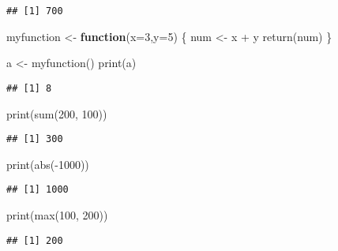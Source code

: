 \documentclass[
]{article}
\newenvironment{Shaded}{\begin{snugshade}}{\end{snugshade}}
\newcommand{\AttributeTok}[1]{\textcolor[rgb]{0.77,0.63,0.00}{#1}}
\newcommand{\ControlFlowTok}[1]{\textcolor[rgb]{0.13,0.29,0.53}{\textbf{#1}}}
\newcommand{\DecValTok}[1]{\textcolor[rgb]{0.00,0.00,0.81}{#1}}
\newcommand{\FunctionTok}[1]{\textcolor[rgb]{0.00,0.00,0.00}{#1}}
\newcommand{\NormalTok}[1]{#1}
\newcommand{\OtherTok}[1]{\textcolor[rgb]{0.56,0.35,0.01}{#1}}
\newcommand{\SpecialCharTok}[1]{\textcolor[rgb]{0.00,0.00,0.00}{#1}}
\begin{document}
\begin{verbatim}
## [1] 700
\end{verbatim}

\begin{Shaded}
\begin{Highlighting}[]
\NormalTok{myfunction }\OtherTok{\textless{}{-}} \ControlFlowTok{function}\NormalTok{(}\AttributeTok{x=}\DecValTok{3}\NormalTok{,}\AttributeTok{y=}\DecValTok{5}\NormalTok{)}
\NormalTok{\{}
\NormalTok{  num }\OtherTok{\textless{}{-}}\NormalTok{ x }\SpecialCharTok{+}\NormalTok{ y}
  \FunctionTok{return}\NormalTok{(num)}
\NormalTok{\}}

\NormalTok{a }\OtherTok{\textless{}{-}} \FunctionTok{myfunction}\NormalTok{()}
\FunctionTok{print}\NormalTok{(a)}
\end{Highlighting}
\end{Shaded}

\begin{verbatim}
## [1] 8
\end{verbatim}

\begin{Shaded}
\begin{Highlighting}[]
\FunctionTok{print}\NormalTok{(}\FunctionTok{sum}\NormalTok{(}\DecValTok{200}\NormalTok{, }\DecValTok{100}\NormalTok{))}
\end{Highlighting}
\end{Shaded}

\begin{verbatim}
## [1] 300
\end{verbatim}

\begin{Shaded}
\begin{Highlighting}[]
\FunctionTok{print}\NormalTok{(}\FunctionTok{abs}\NormalTok{(}\SpecialCharTok{{-}}\DecValTok{1000}\NormalTok{))}
\end{Highlighting}
\end{Shaded}

\begin{verbatim}
## [1] 1000
\end{verbatim}

\begin{Shaded}
\begin{Highlighting}[]
\FunctionTok{print}\NormalTok{(}\FunctionTok{max}\NormalTok{(}\DecValTok{100}\NormalTok{, }\DecValTok{200}\NormalTok{))}
\end{Highlighting}
\end{Shaded}

\begin{verbatim}
## [1] 200
\end{verbatim}
\end{document}
